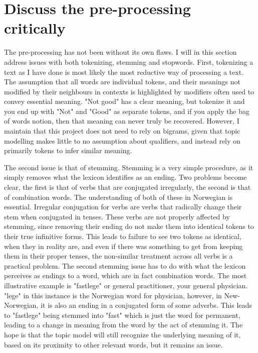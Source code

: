 \documentclass[12pt]{article}
\begin{document}
	\section{Discuss the pre-processing critically}
	The pre-processing has not been without its own flaws. I will in this section address issues with both tokenizing, stemming and stopwords. First, tokenizing a text as I have done is most likely the most reductive way of processing a text. The assumption that all words are individual tokens, and their meanings not modified by their neighbours in contexts is highlighted by modifiers often used to convey essential meaning. "Not good" has a clear meaning, but tokenize it and you end up with "Not" and "Good" as separate tokens, and if you apply the bag of words notion, then that meaning can never truly be recovered. However, I maintain that this project does not need to rely on bigrams, given that topic modelling makes little to no assumption about qualifiers, and instead rely on primarily tokens to infer similar meaning. 
	
	The second issue is that of stemming. Stemming is a very simple procedure, as it simply removes what the lexicon identifies as an ending. Two problems become clear, the first is that of verbs that are conjugated irregularly, the second is that of combination words. The understanding of both of these in Norwegian is essential. Irregular conjugation for verbs are verbs that radically change their stem when conjugated in tenses. These verbs are not properly affected by stemming, since removing their ending do not make them into identical tokens to their true infinitive forms. This leads to failure to see two tokens as identical, when they in reality are, and even if there was something to get from keeping them in their proper tenses, the non-similar treatment across all verbs is a practical problem. The second stemming issue has to do with what the lexicon perceives as endings to a word, which are in fact combination words. The most illustrative example is "fastlege" or general practitioner, your general physician. "lege" in this instance is the Norwegian word for physician, however, in New-Norwegian, it is also an ending in a conjugated form of some adverbs. This leads to "fastlege" being stemmed into "fast" which is just the word for permanent, leading to a change in meaning from the word by the act of stemming it. The hope is that the topic model will still recognize the underlying meaning of it, based on its proximity to other relevant words, but it remains an issue. 
	
\end{document}
